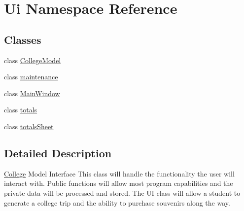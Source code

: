 \hypertarget{namespace_ui}{}\section{Ui Namespace Reference}
\label{namespace_ui}
\subsection*{Classes}
\begin{DoxyCompactItemize}
\item 
class \mbox{\hyperlink{class_ui_1_1_college_model}{College\+Model}}
\item 
class \mbox{\hyperlink{class_ui_1_1maintenance}{maintenance}}
\item 
class \mbox{\hyperlink{class_ui_1_1_main_window}{Main\+Window}}
\item 
class \mbox{\hyperlink{class_ui_1_1totals}{totals}}
\item 
class \mbox{\hyperlink{class_ui_1_1totals_sheet}{totals\+Sheet}}
\end{DoxyCompactItemize}


\subsection{Detailed Description}
\mbox{\hyperlink{struct_college}{College}} Model Interface This class will handle the functionality the user will interact with. Public functions will allow most program capabilities and the private data will be processed and stored. The UI class will allow a student to generate a college trip and the ability to purchase souvenirs along the way. 